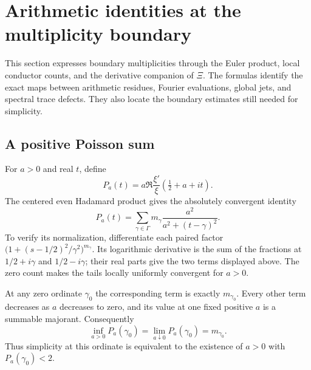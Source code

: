 \section{Arithmetic identities at the multiplicity boundary}
\label{sec:boundary-multiplicity}
This section expresses boundary multiplicities through the Euler
product, local conductor counts, and the derivative companion of
$\Xi$. The formulas identify the exact maps between arithmetic
residues, Fourier evaluations, global jets, and spectral trace defects.
They also locate the boundary estimates still needed for simplicity.

\subsection{A positive Poisson sum}
For $a>0$ and real $t$, define
\[
 P_a(t)=a\Re\frac{\xi'}{\xi}(\tfrac12+a+it).
\]
The centered even Hadamard product gives the absolutely convergent
identity
\begin{equation}\label{eq:poisson-multiplicity}
 P_a(t)=\sum_{\gamma\in\Gamma}
             m_\gamma\frac{a^2}{a^2+(t-\gamma)^2}.
\end{equation}
To verify its normalization, differentiate each paired factor
$\bigl(1+(s-1/2)^2/\gamma^2\bigr)^{m_\gamma}$.
Its logarithmic derivative is the sum of the fractions at
$1/2+i\gamma$ and $1/2-i\gamma$; their real parts give the two
terms displayed above. The zero count makes the tails locally
uniformly convergent for $a>0$.

At any zero ordinate $\gamma_0$ the corresponding term is exactly
$m_{\gamma_0}$. Every other term decreases as $a$ decreases to
zero, and its value at one fixed positive $a$ is a summable
majorant. Consequently
\begin{equation}\label{eq:poisson-infimum}
 \inf_{a>0}P_a(\gamma_0)
 =\lim_{a\downarrow0}P_a(\gamma_0)=m_{\gamma_0}.
\end{equation}
Thus simplicity at this ordinate is equivalent to the existence
of $a>0$ with $P_a(\gamma_0)<2$.

